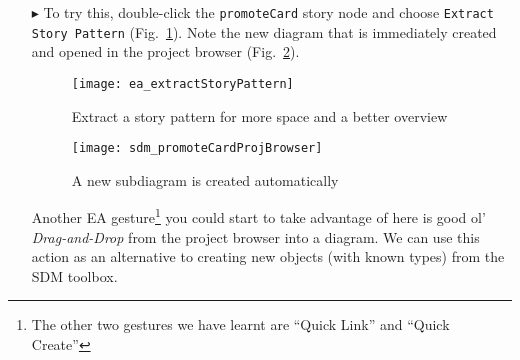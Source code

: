 \begin{itemize}
One great feature of eMolfon (with EA) is a means of coping with large patterns. It might be nice to visualise \emph{small} story patterns directly in their
nodes (such as \texttt{removeCardFromPartition}), but for large patterns or complex control flow, such diagrams would get extremely cumbersome and unwieldy
\emph{very} quickly! This is indeed a popular argument against visual languages and it might have already crossed your mind -- ``This is cute, but it'll
\emph{never} scale!'' With the right tools and concepts however, even huge diagrams can be mastered. eMoflon supports \emph{extracting} story patterns into
their own diagrams, and unless the pattern is really concise with only 2 or 3 object variables, we recommend this course of action. In other words, eMoflon
supports separating your transformation's pattern layer from its imperative control flow layer.

\vspace{0.5cm}

\item[$\blacktriangleright$] To try this, double-click the \texttt{promoteCard} story node and choose \texttt{Extract Story Pattern}
(Fig.~\ref{fig:sdm_check_extract_storypattern}). Note the new diagram that is immediately created and opened in the project browser
(Fig.~\ref{fig:sdm_new_sub_diagram}).

\begin{figure}[htbp]
\begin{center}
  \texttt{[image: ea\_extractStoryPattern]}
  \caption{Extract a story pattern for more space and a better overview}
  \label{fig:sdm_check_extract_storypattern}
\end{center}
\end{figure}

\begin{figure}[htbp]
\begin{center}
  \texttt{[image: sdm\_promoteCardProjBrowser]}
  \caption{A new subdiagram is created automatically}
  \label{fig:sdm_new_sub_diagram}
\end{center}
\end{figure}

\newpage

Another EA gesture\footnote{The other two gestures we have learnt are ``Quick Link'' and ``Quick Create''} you could start to take advantage of here is good
ol' \emph{Drag-and-Drop} from the project browser into a diagram. We can use this action as an alternative to creating new objects (with known types) from
the SDM toolbox.


\end{itemize}
